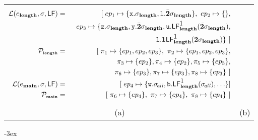 \documentclass[9pt]{sigplanconf}
\begin{document}
\begin{figure*}[t!]
\begin{tabular}{cc}
\begin{minipage}{.51\textwidth}
        \small
\begin{eqnarray*}
        \mathcal{L}(e_{\length},\sigma,\Lfonly) &=&
              [\;ep_1 \mapsto \lbrace \px.\sigma_{\length},
\xl.\cbar\sigma_{\length} \rbrace ,~ep_2 \mapsto \lbrace \rbrace,\\
 &&          \;\;  ep_3 \mapsto \lbrace \pz.\sigma_{\length},
                \py.\cbar\sigma_{\length},
\pu.\Lf{\length}{\mbox{1}}{\cbar\sigma_{\length}},\\
&&            \;\;\;\;\;\;\;\;\;\;\;\;\;\;\;\;\;
\xl.\acdr\Lf{\length}{\mbox{1}}{\cbar\sigma_{\length}}
                \rbrace~\rbrack \\
            \cal{P_{\mbox{\tiny \length}}} &=&
                [\;\pi_1 \mapsto \lbrace ep_1, ep_2, ep_3 \rbrace,  \
                 \pi_2 \mapsto \lbrace ep_1, ep_2, ep_3
                  \rbrace, \\
&&\;\;  \pi_3 \mapsto \lbrace ep_2
                  \rbrace ,  \pi_4 \mapsto \lbrace ep_2
                  \rbrace, \pi_5 \mapsto \lbrace  ep_3 \rbrace, \\
 &&  \;\;                        \pi_6 \mapsto \lbrace ep_3 \rbrace,
\pi_7 \mapsto
                  \lbrace ep_3\rbrace, \pi_8 \mapsto \lbrace ep_3
\rbrace~\rbrack\\
              \mathcal{L}(e_{\main},\sigma,\Lfonly) &=&
                [\;
                  ep_4 \mapsto \lbrace \pw.\sigma_{\mathit{\!all}},
\pb.\Lf{\length}{\mbox{1}}{\sigma_{\mathit{\!all}}}, \ldots\rbrace
                  ]\\
              \cal{P_{\mbox{\tiny \main}}} &=&
                  \lbrack~\pi_6 \mapsto \lbrace ep_4 \rbrace,  \
                   \pi_7 \mapsto \lbrace ep_4 \rbrace,  \
                  \pi_8 \mapsto \lbrace ep_4 \rbrace~\rbrack
\end{eqnarray*}
    \end{minipage} \\
(a)&
(b)
  \end{tabular}
\kern -3ex
\caption{(a) Example program and (b) its liveness
maps.}\label{fig:mot-example2}
\end{figure*}
\end{document}
